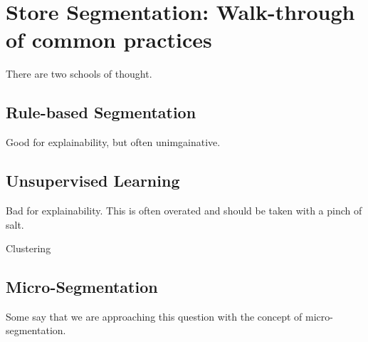 \section{Store Segmentation: Walk-through of common practices}

There are two schools of thought.  

\subsection{Rule-based Segmentation}

Good for explainability, but often unimgainative. 

\subsection{Unsupervised Learning}

Bad for explainability.  This is often overated and should be taken with a pinch of salt.  

Clustering 

\subsection{Micro-Segmentation}

Some say that we are approaching this question with the concept of micro-segmentation.  

\newpage